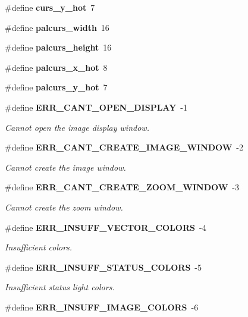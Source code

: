\begin{CompactItemize}
\item 
\#define {\bf curs\_\-y\_\-hot}\ 7\label{xtv_8h_a32}

\item 
\#define {\bf palcurs\_\-width}\ 16\label{xtv_8h_a33}

\item 
\#define {\bf palcurs\_\-height}\ 16\label{xtv_8h_a34}

\item 
\#define {\bf palcurs\_\-x\_\-hot}\ 8\label{xtv_8h_a35}

\item 
\#define {\bf palcurs\_\-y\_\-hot}\ 7\label{xtv_8h_a36}

\item 
\#define {\bf ERR\_\-CANT\_\-OPEN\_\-DISPLAY}\ -1\label{xtv_8h_a37}

\begin{CompactList}\small\item\em Cannot open the image display window. \item\end{CompactList}\item 
\#define {\bf ERR\_\-CANT\_\-CREATE\_\-IMAGE\_\-WINDOW}\ -2\label{xtv_8h_a38}

\begin{CompactList}\small\item\em Cannot create the image window. \item\end{CompactList}\item 
\#define {\bf ERR\_\-CANT\_\-CREATE\_\-ZOOM\_\-WINDOW}\ -3\label{xtv_8h_a39}

\begin{CompactList}\small\item\em Cannot create the zoom window. \item\end{CompactList}\item 
\#define {\bf ERR\_\-INSUFF\_\-VECTOR\_\-COLORS}\ -4\label{xtv_8h_a40}

\begin{CompactList}\small\item\em Insufficient colors. \item\end{CompactList}\item 
\#define {\bf ERR\_\-INSUFF\_\-STATUS\_\-COLORS}\ -5\label{xtv_8h_a41}

\begin{CompactList}\small\item\em Insufficient status light colors. \item\end{CompactList}\item 
\#define {\bf ERR\_\-INSUFF\_\-IMAGE\_\-COLORS}\ -6\label{xtv_8h_a42}


\end{CompactItemize}
